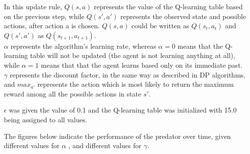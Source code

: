 \documentclass[a4paper,11pt]{article}
\begin{document}
In this update rule, $Q(s,a)$ represents the value of the Q-learning table based on the previous step, while $Q(s',a')$ represents the observed state and possible actions, after action a is chosen. $Q(s,a)$ could be written as $Q(s_t,a_t)$ and $Q(s',a')$ as $Q(s_{t+1}, a_{t+1})$.\\
$\alpha$ represents the algorithm's learning rate, whereas $\alpha =0$ means that the Q-learning table will not be updated (the agent is not learning anything at all), while $\alpha =1$ means that that the agent learns based only on its immediate past.\\
$\gamma$ represents the discount factor, in the same way as described in DP algorithms, and $max_{a'}$ represents the action which is most likely to return the maximum reward among all the possible actions in state $s'$.

$\epsilon$ was given the value of 0.1 and the Q-learning table was initialized with 15.0 being assigned to all values. 


The figures below indicate the performance of the predator over time, given different values for $\alpha$ , and different values for $\gamma$.
\end{document}
